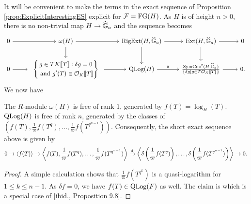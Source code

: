 \documentclass[../main.tex]{subfiles}
\begin{document}
It will be convenient to make the terms in the exact sequence of Proposition 
\ref{prop:ExplicitInterestingES} explicit for $\mathcal{F} = \textnormal{FG}(H)$. As $H$ is of height $n>0$, 
there is no non-trivial map $H \to \widehat{\mathbb{G}}_a$ and the sequence becomes
\begin{equation*}
\begin{tikzcd}[ampersand replacement=\&]
	0 \& {\omega(H)} \& {\RigExt(H,\Ghat_a)} \& {\Ext(H,\Ghat_a)} \& 0 \\
	0 \& \begin{array}{c} \left\{\begin{gathered} {g \in TK\llbr T \rrbr : \delta g = 0} \\          \text{ and $g'(T) \in \cO_K\llbr T \rrbr$}\end{gathered} \right\} \end{array} \& {\QLog(H)} \& {\frac{\SymCoc^2(H, \Ghat_a)}{\{\delta g \mid g \in T \cO_K\llbr T \rrbr\}}} \& 0.
	\arrow[from=1-1, to=1-2]
	\arrow[from=1-2, to=1-3]
	\arrow[from=1-2, to=2-2]
	\arrow[from=1-3, to=1-4]
	\arrow[from=1-3, to=2-3]
	\arrow[from=1-4, to=1-5]
	\arrow[from=1-4, to=2-4]
	\arrow["", from=2-1, to=2-2]
	\arrow[from=2-2, to=2-3]
	\arrow["\delta", from=2-3, to=2-4]
	\arrow[from=2-4, to=2-5]
\end{tikzcd}   
\end{equation*}
We now have 
\begin{prop}
  The $R$-module $\omega(H)$ is free of rank $1$, generated by 
  $f(T) = \log_H(T)$. $\operatorname {QLog}(H)$ is free of rank $n$, generated by the classes of
  $(f(T), \frac 1\varpi f(T^q), \dots, \frac 1\varpi f(T^{q^{n-1}}))$. Consequently,
  the short exact sequence above is given by 
  \begin{equation*}
    0 \to \left \langle f(T) \right \rangle \to \left \langle f(T), \frac 1\varpi
      f(T^q) , \dots,
    \frac 1\varpi f(T^{q^{n-1}}) \right \rangle \xrightarrow{\delta} 
    \left \langle \delta \left(\frac 1\varpi f(T^q)\right),\dots, \delta
    \left(\frac 1\varpi f(T^{q^{n-1}})\right ) \right \rangle \to 0.
  \end{equation*}
\begin{proof}
  A simple calculation shows that $\frac 1\varpi f(T^{q^k})$ is a quasi-logarithm for 
  $1 \leq k \leq n-1$. As $\delta f = 0$, we have $f(T) \in \operatorname {QLog}(F)$ as well. 
  The claim is \cite[Proposition 13.8]{hopkins1994equivariant} which is a 
  special case of [ibid., Proposition 9.8].
\end{proof}
\end{prop}
\end{document}
